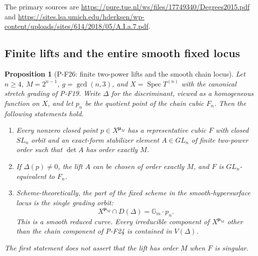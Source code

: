 \documentclass[11pt,a4paper]{article}
\newtheorem{proposition}{Proposition}[section]
\begin{document}
The primary sources are
\url{https://pure.tue.nl/ws/files/17749340/Degrees2015.pdf}
and
\url{https://sites.lsa.umich.edu/hderksen/wp-content/uploads/sites/614/2018/05/A.I.a.7.pdf}.


\subsection{Finite lifts and the entire smooth fixed locus}

\begin{proposition}[P-F26: finite two-power lifts and the smooth chain locus]
\label{prop:finitecubiclift}
Let $n\ge4$, $M=2^{n-1}$, $g=\gcd(n,3)$, and
$X=\operatorname{Spec}T^{(n)}$ with the canonical stretch grading
of P-F19. Write $\Delta$ for the discriminant, viewed as a
homogeneous function on $X$, and let $p_n$ be the quotient point
of the chain cubic $F_n$. Then the following statements hold.

\begin{enumerate}
\item Every nonzero closed point $p\in X^{\boldsymbol\mu_M}$
has a representative cubic $F$ with closed $SL_n$ orbit and an
exact-form stabilizer element $A\in GL_n$ of finite two-power
order such that $\det A$ has order exactly $M$.
\item If $\Delta(p)\ne0$, the lift $A$ can be chosen of order
exactly $M$, and $F$ is $GL_n$-equivalent to $F_n$.
\item Scheme-theoretically, the part of the fixed scheme in
the smooth-hypersurface locus is the single grading orbit:
\[
 X^{\boldsymbol\mu_M}\cap D(\Delta)
      =\mathbb G_m\cdot p_n.
 \tag{P-F26a}
\]
This is a smooth reduced curve. Every irreducible component of
$X^{\boldsymbol\mu_M}$ other than the chain component of P-F24
is contained in $V(\Delta)$.
\end{enumerate}
The first statement does not assert that the lift has order $M$
when $F$ is singular.
\end{proposition}
\end{document}
